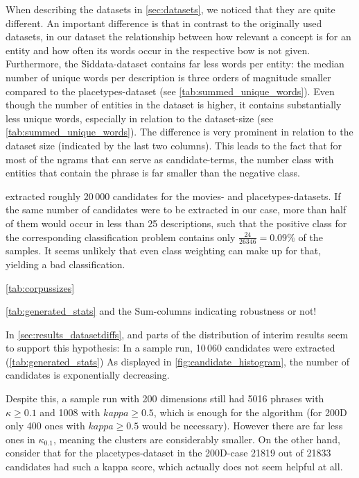 When describing the datasets in \autoref{sec:datasets}, we noticed that they are quite different. An important difference is that in contrast to the originally used datasets, in our dataset the relationship between how relevant a concept is for an entity and how often its words occur in the respective \gls{bow} is not given. Furthermore, the Siddata-dataset contains far less words per entity: the median number of unique words per description is three orders of magnitude smaller compared to the placetypes-dataset (see \autoref{tab:summed_unique_words}). Even though the number of entities in the dataset is higher, it contains substantially less unique words, especially in relation to the dataset-size (see \autoref{tab:summed_unique_words}). The difference is very prominent in relation to the dataset size (indicated by the last two columns). This leads to the fact that for most of the \glspl{ngram} that can serve as candidate-terms, the number class with entities that contain the phrase is far smaller than the negative class. 

\textcite{Derrac2015} extracted roughly 20\,000 candidates for the movies- and placetypes-datasets. If the same number of candidates were to be extracted in our case, more than half of them would occur in less than 25 descriptions, such that the positive class for the corresponding classification problem contains only $\frac{24}{26346}=0.09\%$ of the samples. It seems unlikely that even class weighting can make up for that, yielding a bad classification. 

 \autoref{tab:corpussizes} 

 \autoref{tab:generated_stats} and the Sum-columns indicating robustness or not!

In \autoref{sec:results_datasetdiffs}, and parts of the distribution of interim results seem to support this hypothesis: In a sample run, 10\,060 candidates were extracted (\autoref{tab:generated_stats}) As displayed in \autoref{fig:candidate_histogram}, the number of candidates is exponentially decreasing. 

Despite this, a sample run with 200 dimensions still had 5016 phrases with $\kappa \geq 0.1$ and 1008 with $kappa \geq 0.5$, which is enough for the algorithm (for 200D only 400 ones with $kappa \geq 0.5$ would be necessary). However there are far less ones in $\kappa_{0.1}$, meaning the clusters are considerably smaller. On the other hand, consider that for the placetypes-dataset in the 200D-case 21819 out of 21833 candidates had such a kappa score, which actually does not seem helpful at all.


